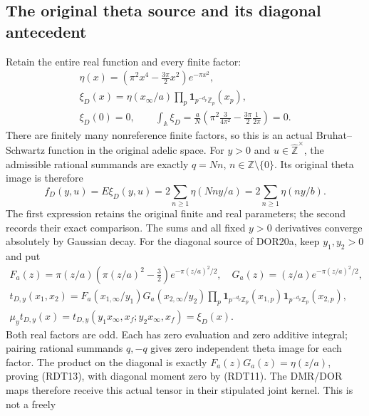 \subsection{The original theta source and its diagonal antecedent}
Retain the entire real function and every finite factor:
\begin{equation}\tag{RDT11}
\begin{gathered}
\eta(x)=\left(\pi^2x^4-\frac{3\pi}{2}x^2\right)e^{-\pi x^2},\\
\xi_D(x)=\eta(x_\infty/a)\prod_p\mathbf1_{p^{-d_p}\mathbb Z_p}(x_p),\\
\xi_D(0)=0,\qquad
\int_{\mathbb A}\xi_D
=\frac{a}{N}\left(\pi^2\frac{3}{4\pi^2}
                    -\frac{3\pi}{2}\frac{1}{2\pi}\right)=0.
\end{gathered}
\end{equation}
There are finitely many nonreference finite factors, so this is an
actual Bruhat--Schwartz function in the original adelic space. For
$y>0$ and $u\in\widehat{\mathbb Z}^{\times}$, the admissible rational
summands are exactly $q=Nn$, $n\in\mathbb Z\setminus\{0\}$.
Its original theta image is therefore
\begin{equation}\tag{RDT12}
f_D(y,u)=E\xi_D(y,u)
=2\sum_{n\ge1}\eta(Nny/a)=2\sum_{n\ge1}\eta(ny/b).
\end{equation}
The first expression retains the original finite and real parameters;
the second records their exact comparison. The sums and all fixed
$y>0$ derivatives converge absolutely by Gaussian decay.
For the diagonal source of DOR20a, keep $y_1,y_2>0$ and put
\begin{equation}\tag{RDT13}
\begin{gathered}
F_a(z)=\pi(z/a)(\pi(z/a)^2-\tfrac32)e^{-\pi(z/a)^2/2},\quad
G_a(z)=(z/a)e^{-\pi(z/a)^2/2},\\
t_{D,y}(x_1,x_2)=F_a(x_{1,\infty}/y_1)G_a(x_{2,\infty}/y_2)
\prod_p\mathbf1_{p^{-d_p}\mathbb Z_p}(x_{1,p})
          \mathbf1_{p^{-d_p}\mathbb Z_p}(x_{2,p}),\\
\mu_y t_{D,y}(x)=t_{D,y}(y_1x_\infty,x_f;y_2x_\infty,x_f)
=\xi_D(x).
\end{gathered}
\end{equation}
Both real factors are odd. Each has zero evaluation and zero additive
integral; pairing rational summands $q,-q$ gives zero independent
theta image for each factor. The product on the diagonal is exactly
$F_a(z)G_a(z)=\eta(z/a)$, proving (RDT13), with diagonal moment
zero by (RDT11). The DMR/DOR maps therefore receive this actual
tensor in their stipulated joint kernel. This is not a freely
